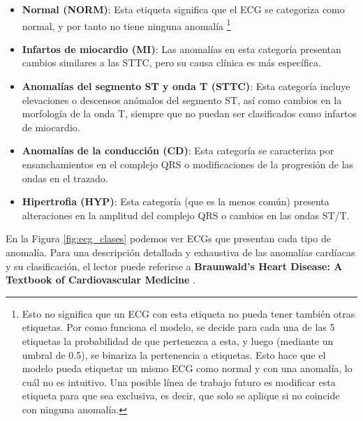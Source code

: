 	 \begin{itemize}
	 	\item \textbf{Normal (NORM)}: Esta etiqueta significa que el ECG se categoriza como normal, y por tanto no tiene ninguna anomalía \footnote{Esto no significa que un ECG con esta etiqueta no pueda tener también otras etiquetas. Por como funciona el modelo, se decide para cada una de las 5 etiquetas la probabilidad de que pertenezca a esta, y luego (mediante un umbral de 0.5), se binariza la pertenencia a etiquetas. Esto hace que el modelo pueda etiquetar un mismo ECG como normal y con una anomalía, lo cuál no es intuitivo. Una posible línea de trabajo futuro es modificar esta etiqueta para que sea exclusiva, es decir, que solo se aplique si no coincide con ninguna anomalía.}
	 	
	 	\item \textbf{Infartos de miocardio (MI)}: Las anomalías en esta categoría presentan cambios similares a las STTC, pero su causa clínica es más específica.
	 	
	 	\item \textbf{Anomalías del segmento ST y onda T (STTC)}: Esta categoría incluye elevaciones o descensos anómalos del segmento ST, así como cambios en la morfología de la onda T, siempre que no puedan ser clasificados como infartos de miocardio.
	 	
	 		 	
	 	\item \textbf{Anomalías de la conducción (CD)}: Esta categoría se caracteriza por ensanchamientos en el complejo QRS o modificaciones de la progresión de las ondas en el trazado.

	 	\item \textbf{Hipertrofia (HYP)}: Esta categoría (que es la menos común) presenta alteraciones en la amplitud del complejo QRS o cambios en las ondas ST/T.	 	

	 \end{itemize}
	 
	 En la Figura \ref{fig:ecg_clases} podemos ver ECGs que presentan cada tipo de anomalía. Para una descripción detallada y exhaustiva de las anomalías cardíacas y su clasificación, el lector puede referirse a \textbf{Braunwald's Heart Disease: A Textbook of Cardiovascular Medicine} \cite{Mann2021}.
	 
